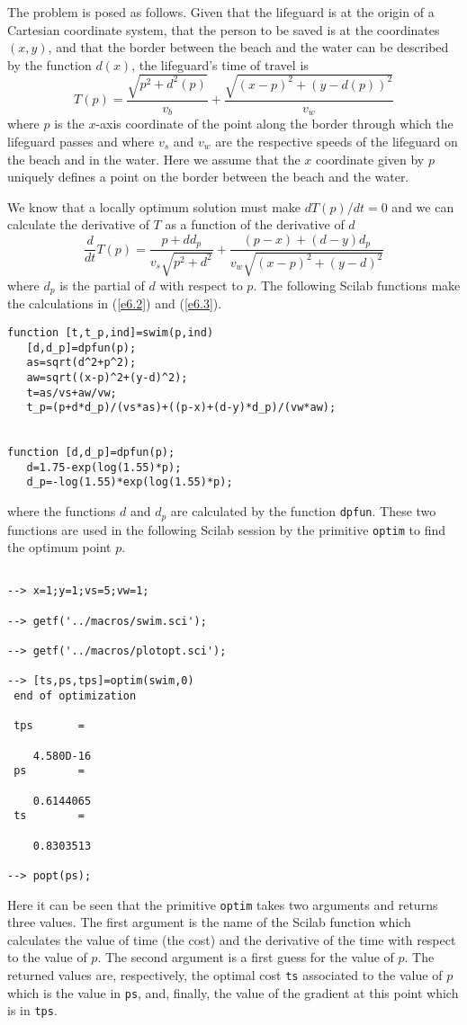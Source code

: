 	The problem is posed as follows.  Given that the lifeguard 
is at the origin of a Cartesian coordinate system, that the person
to be saved is at the coordinates $(x,y)$, and that the border
between the beach and the water can be described by the function
$d(x)$, the lifeguard's time of travel is
\begin{equation}
T(p)=\frac{\sqrt{p^2+d^2(p)}}{v_b}+\frac{\sqrt{(x-p)^2+(y-d(p))^2}}{v_w}
\label{e6.2}
\end{equation}
where $p$ is the $x$-axis coordinate of the point along the border through
which the lifeguard passes and
where $v_s$ and $v_w$ are the respective 
speeds of the lifeguard on the beach and in the water.
Here we assume that the $x$ coordinate given by $p$ uniquely defines
a point on the border between the beach and the water.

	We know that a locally optimum solution must make 
$dT(p)/dt=0$ and we can calculate the derivative of $T$ as
a function of the derivative of $d$
\begin{equation}
\frac{d}{dt}T(p)=\frac{p+dd_p}{v_s\sqrt{p^2+d^2}}
                 +\frac{(p-x)+(d-y)d_p}{v_w\sqrt{(x-p)^2+(y-d)^2}}
\label{e6.3}
\end{equation}
where $d_p$ is the partial of $d$ with respect to $p$.  The following
Scilab functions make the calculations in (\ref{e6.2}) and (\ref{e6.3}).
\begin{verbatim}
function [t,t_p,ind]=swim(p,ind)
   [d,d_p]=dpfun(p);
   as=sqrt(d^2+p^2);
   aw=sqrt((x-p)^2+(y-d)^2);
   t=as/vs+aw/vw;
   t_p=(p+d*d_p)/(vs*as)+((p-x)+(d-y)*d_p)/(vw*aw);


function [d,d_p]=dpfun(p);
   d=1.75-exp(log(1.55)*p);
   d_p=-log(1.55)*exp(log(1.55)*p);
\end{verbatim}
where the functions $d$ and $d_p$ are calculated by the function {\tt dpfun}.
These two functions are used in the following Scilab session by the
primitive {\tt optim} to find the optimum point $p$.
\begin{verbatim}
 
--> x=1;y=1;vs=5;vw=1;
 
--> getf('../macros/swim.sci');
 
--> getf('../macros/plotopt.sci');
 
--> [ts,ps,tps]=optim(swim,0)
 end of optimization
 
 tps       =
 
    4.580D-16  
 ps        =
 
    0.6144065  
 ts        =
 
    0.8303513  
 
--> popt(ps);
\end{verbatim}
Here it can be seen that the primitive {\tt optim} takes two 
arguments and returns three values.  The first argument is the
name of the Scilab function which calculates the value of time (the cost)
and the derivative of the time with respect to the value of $p$.
The second argument is a first guess for the value of $p$.
The returned values are, respectively, the optimal cost {\tt ts}
associated to the value of $p$ which is the value in {\tt ps}, and,
finally, the value of the gradient at this point which is in
{\tt tps}.

